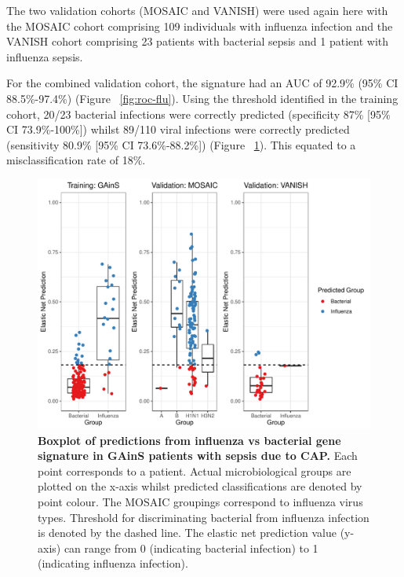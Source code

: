 The two validation cohorts (MOSAIC and VANISH) were used again here with the MOSAIC cohort comprising 109 individuals with influenza infection and the VANISH cohort comprising 23 patients with bacterial sepsis and 1 patient with influenza sepsis.

For the combined validation cohort, the signature had an AUC of 92.9\% (95\% CI 88.5\%-97.4\%) (Figure ~\ref{fig:roc-flu}). Using the threshold identified in the training cohort, 20/23 bacterial infections were correctly predicted (specificity 87\% [95\% CI 73.9\%-100\%]) whilst 89/110 viral infections were correctly predicted (sensitivity 80.9\% [95\% CI 73.6\%-88.2\%]) (Figure ~\ref{fig:boxplot-flu}). This equated to a misclassification rate of 18\%. 

\FloatBarrier
\begin{figure}[htbp]
\centering
\includegraphics[width=\textwidth]{./Results3/Images/boxplot-influenza-signature.pdf}
\caption[Boxplot of influenza vs bacterial signature]{\textbf{Boxplot of predictions from influenza vs bacterial gene signature in GAinS patients with sepsis due to CAP.} Each point corresponds to a patient. Actual microbiological groups are plotted on the x-axis whilst predicted classifications are denoted by point colour. The MOSAIC groupings correspond to influenza virus types. Threshold for discriminating bacterial from influenza infection is denoted by the dashed line. The elastic net prediction value (y-axis) can range from 0 (indicating bacterial infection) to 1 (indicating influenza infection).}
\label{fig:boxplot-flu}
\end{figure}
\FloatBarrier


